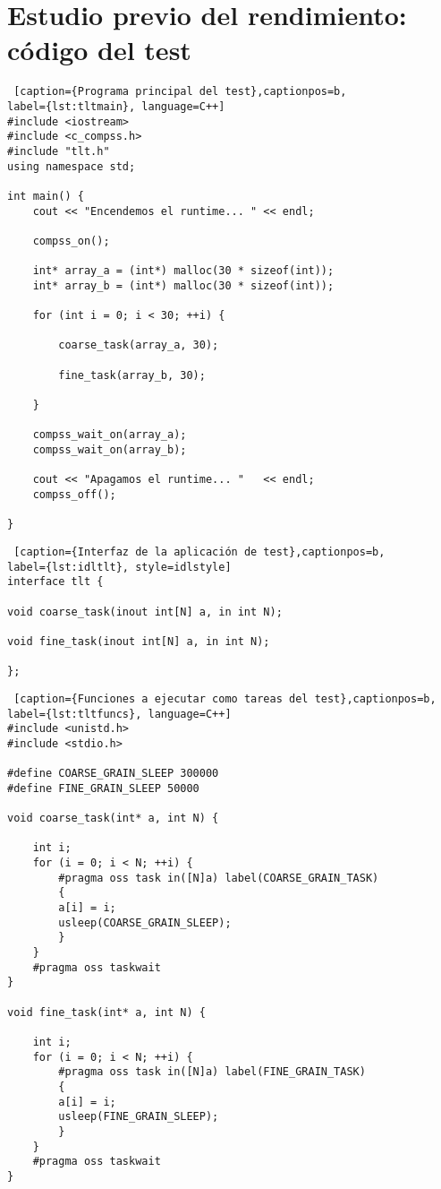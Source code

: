 \section{Estudio previo del rendimiento: código del test}
\label{appendix:estudioprevio}

\begin{minipage}{\linewidth}
\begin{lstlisting} [caption={Programa principal del test},captionpos=b, 
label={lst:tltmain}, language=C++]
#include <iostream>
#include <c_compss.h>
#include "tlt.h"
using namespace std;

int main() {
	cout << "Encendemos el runtime... " << endl;

	compss_on();
	
	int* array_a = (int*) malloc(30 * sizeof(int));
	int* array_b = (int*) malloc(30 * sizeof(int));
	
	for (int i = 0; i < 30; ++i) {
	
		coarse_task(array_a, 30);
		
		fine_task(array_b, 30);
	
	}
	
	compss_wait_on(array_a);
	compss_wait_on(array_b);   
		
	cout << "Apagamos el runtime... "   << endl;
	compss_off();

}   
\end{lstlisting}
\end{minipage}

\begin{minipage}{\linewidth}
\begin{lstlisting} [caption={Interfaz de la aplicación de test},captionpos=b, 
label={lst:idltlt}, style=idlstyle] 
interface tlt {

void coarse_task(inout int[N] a, in int N);

void fine_task(inout int[N] a, in int N);

};
\end{lstlisting}
\end{minipage}

\begin{minipage}{\linewidth}
\begin{lstlisting} [caption={Funciones a ejecutar como tareas del test},captionpos=b,
label={lst:tltfuncs}, language=C++] 
#include <unistd.h>
#include <stdio.h>

#define COARSE_GRAIN_SLEEP 300000
#define FINE_GRAIN_SLEEP 50000

void coarse_task(int* a, int N) {
	
	int i;
	for (i = 0; i < N; ++i) {
		#pragma oss task in([N]a) label(COARSE_GRAIN_TASK) 
		{
		a[i] = i;
		usleep(COARSE_GRAIN_SLEEP);
		}
	}
	#pragma oss taskwait
}

void fine_task(int* a, int N) {
	
	int i;
	for (i = 0; i < N; ++i) {
		#pragma oss task in([N]a) label(FINE_GRAIN_TASK)
		{
		a[i] = i;
		usleep(FINE_GRAIN_SLEEP);
		}
	} 
	#pragma oss taskwait
}  
\end{lstlisting}
\end{minipage}